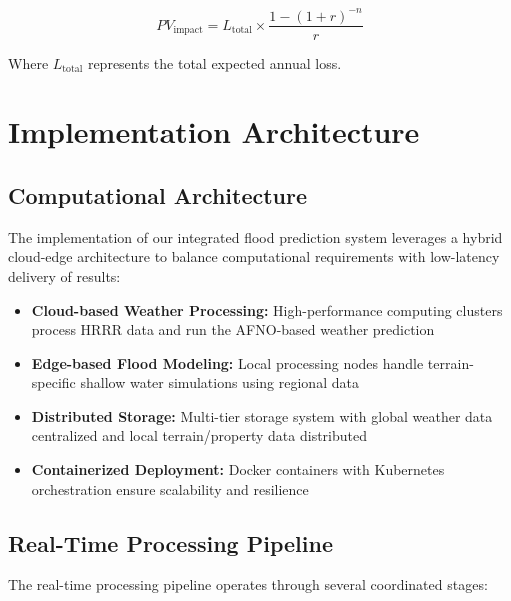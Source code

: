 \documentclass{article}
\begin{document}
\begin{equation}
PV_{\text{impact}} = L_{\text{total}} \times \frac{1 - (1 + r)^{-n}}{r}
\end{equation}

Where $L_{\text{total}}$ represents the total expected annual loss.

\section{Implementation Architecture}
\subsection{Computational Architecture}

The implementation of our integrated flood prediction system leverages a hybrid cloud-edge architecture to balance computational requirements with low-latency delivery of results:

\begin{itemize}
    \item \textbf{Cloud-based Weather Processing:} High-performance computing clusters process HRRR data and run the AFNO-based weather prediction
    
    \item \textbf{Edge-based Flood Modeling:} Local processing nodes handle terrain-specific shallow water simulations using regional data
    
    \item \textbf{Distributed Storage:} Multi-tier storage system with global weather data centralized and local terrain/property data distributed
    
    \item \textbf{Containerized Deployment:} Docker containers with Kubernetes orchestration ensure scalability and resilience
\end{itemize}

\subsection{Real-Time Processing Pipeline}

The real-time processing pipeline operates through several coordinated stages:
\end{document}
